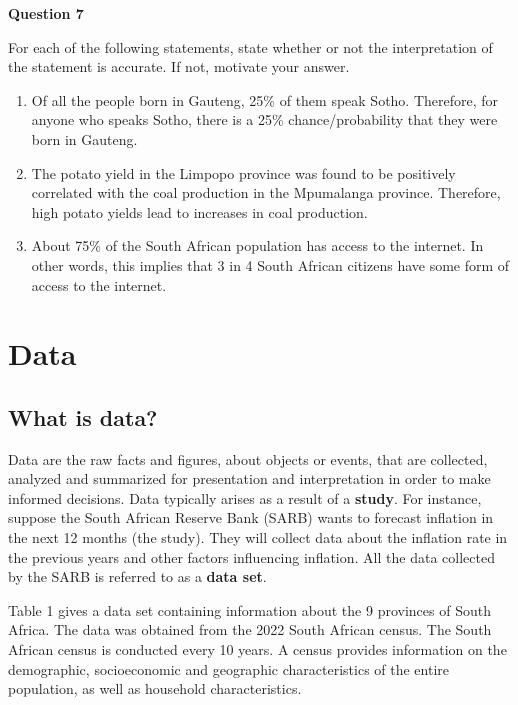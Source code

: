 \documentclass[
]{book}
\begin{document}
\textbf{Question 7}

For each of the following statements, state whether or not the interpretation of the statement is accurate. If not, motivate your answer.

\begin{enumerate}
\def\labelenumi{\alph{enumi}.}
\item
  Of all the people born in Gauteng, 25\% of them speak Sotho. Therefore, for anyone who speaks Sotho, there is a 25\% chance/probability that they were born in Gauteng.
\item
  The potato yield in the Limpopo province was found to be positively correlated with the coal production in the Mpumalanga province. Therefore, high potato yields lead to increases in coal production. ~
\item
  About 75\% of the South African population has access to the internet. In other words, this implies that 3 in 4 South African citizens have some form of access to the internet.
\end{enumerate}

\newpage

\section{Data}\label{data}

\subsection{What is data?}\label{what-is-data}

Data are the raw facts and figures, about objects or events, that are collected, analyzed and summarized for presentation and interpretation in order to make informed decisions. Data typically arises as a result of a \textbf{study}. For instance, suppose the South African Reserve Bank (SARB) wants to forecast inflation in the next 12 months (the study). They will collect data about the inflation rate in the previous years and other factors influencing inflation. All the data collected by the SARB is referred to as a \textbf{data set}.

Table 1 gives a data set containing information about the 9 provinces of South Africa. The data was obtained from the 2022 South African census. The South African census is conducted every 10 years. A census provides information on the demographic, socioeconomic and geographic characteristics of the entire population, as well as household characteristics.
\end{document}
